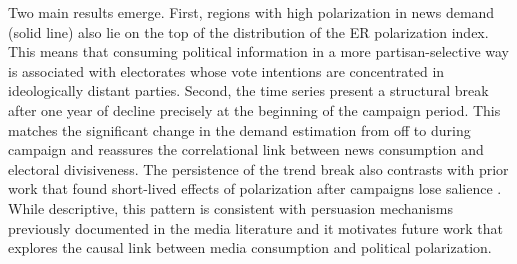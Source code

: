 \documentclass[12pt]{article}
\begin{document}
Two main results emerge. First, regions with high polarization in news demand (solid line) also lie on the top of the distribution of the ER polarization index. This means that consuming political information in a more partisan-selective way is associated with electorates whose vote intentions are concentrated in ideologically distant parties. Second, the time series present a structural break after one year of decline precisely at the beginning of the campaign period. This matches the significant change in the demand estimation from off to during campaign and reassures the correlational link between news consumption and electoral divisiveness. The persistence of the trend break also contrasts with prior work that found short-lived effects of polarization after campaigns lose salience \citep{Hernndez2020AffectivePA}. While descriptive, this pattern is consistent with persuasion mechanisms previously documented in the media literature and it motivates future work that explores the causal link between media consumption and political polarization.

	
	
	
	
	
\end{document}
